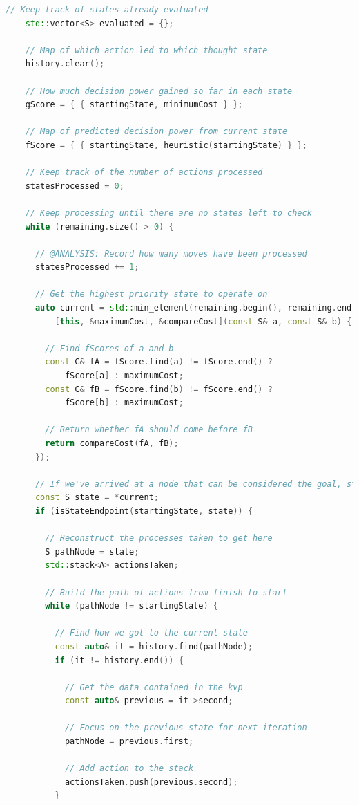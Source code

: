 \documentclass[11pt, a4paper]{report}
\begin{document}
\begin{appendices}
\begin{lstlisting}[language=C++]
    // Keep track of states already evaluated
    std::vector<S> evaluated = {};
    
    // Map of which action led to which thought state
    history.clear();

    // How much decision power gained so far in each state
    gScore = { { startingState, minimumCost } };

    // Map of predicted decision power from current state
    fScore = { { startingState, heuristic(startingState) } };

    // Keep track of the number of actions processed
    statesProcessed = 0;

    // Keep processing until there are no states left to check
    while (remaining.size() > 0) {

      // @ANALYSIS: Record how many moves have been processed
      statesProcessed += 1;

      // Get the highest priority state to operate on
      auto current = std::min_element(remaining.begin(), remaining.end(),
          [this, &maximumCost, &compareCost](const S& a, const S& b) {

        // Find fScores of a and b
        const C& fA = fScore.find(a) != fScore.end() ?
            fScore[a] : maximumCost;
        const C& fB = fScore.find(b) != fScore.end() ?
            fScore[b] : maximumCost;

        // Return whether fA should come before fB
        return compareCost(fA, fB);
      });

      // If we've arrived at a node that can be considered the goal, stop
      const S state = *current;
      if (isStateEndpoint(startingState, state)) {

        // Reconstruct the processes taken to get here
        S pathNode = state;
        std::stack<A> actionsTaken;

        // Build the path of actions from finish to start
        while (pathNode != startingState) {

          // Find how we got to the current state
          const auto& it = history.find(pathNode);
          if (it != history.end()) {

            // Get the data contained in the kvp
            const auto& previous = it->second;

            // Focus on the previous state for next iteration
            pathNode = previous.first;

            // Add action to the stack
            actionsTaken.push(previous.second);
          }


\end{lstlisting}
\end{appendices}
\end{document}
